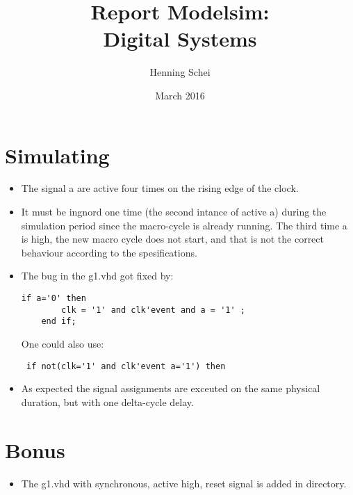\documentclass{article}
\title{Report Modelsim: \\ Digital Systems}
\author{Henning Schei}
\date{March 2016}
\begin{document}
\maketitle


\section{Simulating}

\begin{itemize}

\item The signal a are active four times on the rising edge of the clock.
\item It must be ingnord one time (the second intance of active a) during the simulation period since the macro-cycle is already running. The third time a is high, the new macro cycle does not start, and that is not the correct behaviour according to the spesifications.
\item  The bug in the g1.vhd got fixed by: \begin {lstlisting}
if a='0' then
        clk = '1' and clk'event and a = '1' ;
    end if;
\end{lstlisting}
One could also use: 
 \begin {lstlisting}
 if not(clk='1' and clk'event a='1') then
\end{lstlisting}
\item As expected the signal assignments are exceuted on the same physical duration, but with one delta-cycle delay.  

\end{itemize}

\section {Bonus}
\begin{itemize}
\item The g1.vhd with synchronous, active high, reset signal is added in directory. 
\end{itemize}
\end{document}
